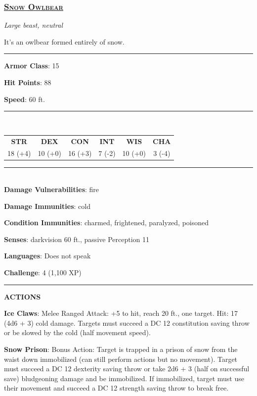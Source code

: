 \subsubsection*{\underline{\textsc{\Large Snow Owlbear}}}
\noindent\emph{Large beast, neutral}

It's an owlbear formed entirely of snow.

\noindent\rule{0.5\textwidth}{0.5pt}

\noindent\textbf{Armor Class}: 15

\noindent\textbf{Hit Points}: 88

\noindent\textbf{Speed}: 60 ft.

\noindent\rule{0.5\textwidth}{0.5pt} \\
\begin{table}[H]
	\begin{tabular}{cccccc}
		\textbf{STR} & \textbf{DEX} & \textbf{CON} & \textbf{INT} & \textbf{WIS} & \textbf{CHA} \\
		18 (+4) & 10 (+0) & 16 (+3) & 7 (-2) & 10 (+0) & 3 (-4) \\
	\end{tabular}
\end{table}
\noindent\rule{0.5\textwidth}{0.5pt} \\

\noindent\textbf{Damage Vulnerabilities}: fire

\noindent\textbf{Damage Immunities}: cold

\noindent\textbf{Condition Immunities}: charmed, frightened, paralyzed, poisoned

\noindent\textbf{Senses}: darkvision 60 ft., passive Perception 11

\noindent\textbf{Languages}: Does not speak

\noindent\textbf{Challenge}: 4 (1,100 XP)

\noindent\rule{0.5\textwidth}{0.5pt}

\noindent\textbf{ACTIONS}

\noindent\textbf{Ice Claws}: Melee Ranged Attack: +5 to hit, reach 20 ft., one target. Hit: 17 (4d6 + 3) cold damage. Targets must succeed a DC 12 constitution saving throw or be slowed by the cold (half movement speed).

\noindent\textbf{Snow Prison}: Bonus Action: Target is trapped in a prison of snow from the waist down immobilized (can still perform actions but no movement). Target must succeed a DC 12 dexterity saving throw or take 2d6 + 3 (half on successful save) bludgeoning damage and be immobilized. If immobilized, target must use their movement and succeed a DC 12 strength saving throw to break free.

